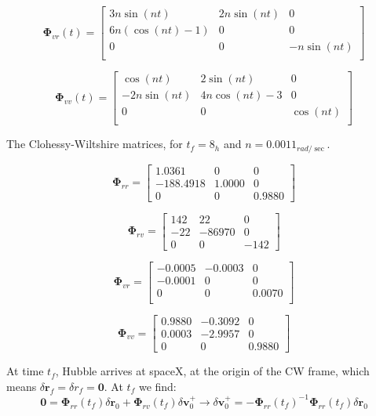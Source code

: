 $$
\boldsymbol \Phi_{vr}(t) = \begin{bmatrix}
    3n\sin(nt) & 2n\sin(nt) & 0\\
    6n(\cos(nt) -1) & 0 & 0\\
    0 & 0 & -n\sin(nt)\\
\end{bmatrix}
$$

$$
\boldsymbol \Phi_{vv}(t) = \begin{bmatrix}
    \cos(nt) & 2\sin(nt) & 0\\
    -2n\sin(nt) & 4n\cos(nt)-3 & 0\\
    0 & 0 & \cos(nt)\\
\end{bmatrix}
$$

The Clohessy-Wiltshire matrices, for $t_f = 8_h$ and $n = 0.0011_{rad/\sec}$.

$$
\boldsymbol \Phi_{rr} = 
\begin{bmatrix}
    1.0361     &    0   &      0\\
    -188.4918 &   1.0000     &    0\\
            0     &    0    &0.9880
\end{bmatrix}
$$


$$
\boldsymbol \Phi_{rv} = 
\begin{bmatrix}
    142  &  22      &   0 \\
    -22 &  -86970 &     0\\
          0    &     0 &   -142
\end{bmatrix}
$$

$$
\boldsymbol \Phi_{vr} = 
\begin{bmatrix}
    -0.0005  & -0.0003   &      0\\
    -0.0001   &      0  &       0\\
          0    &     0 & 0.0070\\
\end{bmatrix}
$$

$$
\boldsymbol \Phi_{vv} = 
\begin{bmatrix}
    0.9880  & -0.3092   &      0\\
    0.0003  & -2.9957  &       0\\
         0   &      0 &   0.9880
\end{bmatrix}
$$

At time $t_f$, Hubble arrives at spaceX, at the origin of the CW frame, which means $\delta \boldsymbol r_f = \delta r_f = \boldsymbol 0$. At $t_f$ we find:
$$
\boldsymbol 0 = \boldsymbol \Phi_{rr}(t_f) \delta \boldsymbol r_0 + \boldsymbol \Phi_{rv}(t_f) \delta \boldsymbol v_0^+
\rightarrow \delta \boldsymbol v_0^+ = -\boldsymbol \Phi_{rr}(t_f)^{-1} \boldsymbol \Phi_{rr}(t_f) \delta \boldsymbol r_0
$$

